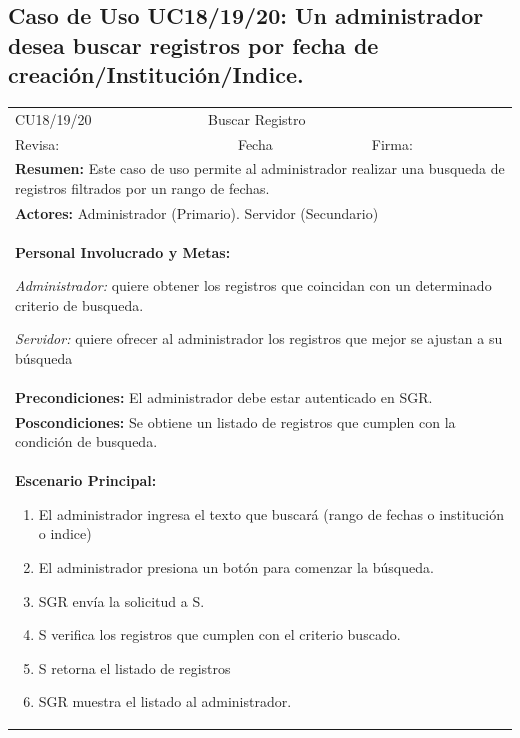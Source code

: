 		\subsection{Caso de Uso UC18/19/20: Un administrador desea buscar registros por fecha de creación/Institución/Indice.}
			\begin{longtable}{|l|p{5.5cm}|l|p{2cm}|l|p{1.9cm}|} \hline
					\cellcolor{grisOscuro} CU18/19/20 & \multicolumn{4}{|l|}{  \cellcolor{grisOscuro} Buscar Registro} &  \cellcolor{grisClaro}\multirow{2}{1cm}{} \\ \cline{1-5}
					\cellcolor{grisOscuro} Revisa: &  \cellcolor{grisClaro} &  \cellcolor{grisOscuro} Fecha &  \cellcolor{grisClaro} &  \cellcolor{grisOscuro} Firma: & \cellcolor{grisClaro} \\ \hline
					\multicolumn{6}{|p{15cm}|}{ \textbf{Resumen: } Este caso de uso permite al administrador realizar una busqueda de registros filtrados por un rango de fechas.

					} \\ \hline

					\multicolumn{6}{|p{15cm}|}{ \textbf{Actores: } Administrador (Primario). Servidor (Secundario)

					} \\ \hline

					\multicolumn{6}{|p{15cm}|}{ \textbf{Personal Involucrado y Metas: }
					
					\emph{Administrador:} quiere obtener los registros que coincidan con un determinado criterio de busqueda.

					\emph{Servidor:} quiere ofrecer al administrador los registros que mejor se ajustan a su búsqueda

					} \\ \hline

					\multicolumn{6}{|p{15cm}|}{ \textbf{Precondiciones: } El administrador debe estar autenticado en SGR.

					} \\ \hline

					\multicolumn{6}{|p{15cm}|}{ \textbf{Poscondiciones: } Se obtiene un listado de registros que cumplen con la condición de busqueda.

					} \\ \hline

					\multicolumn{6}{|p{15cm}|}{ \textbf{Escenario Principal: }

					\begin{enumerate}
							\item El administrador ingresa el texto que buscará (rango de fechas o institución o indice)
							\item El administrador presiona un botón para comenzar la búsqueda.
							\item SGR envía la solicitud a S.
							\item S verifica los registros que cumplen con el criterio buscado.
							\item S retorna el listado de registros
							\item SGR muestra el listado al administrador.
					\end{enumerate}

}
\end{longtable}
